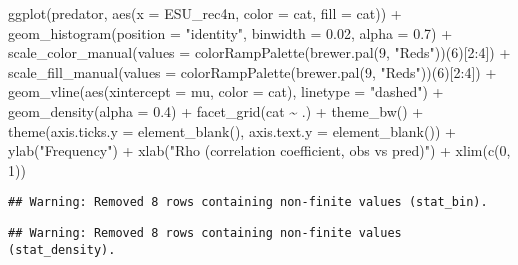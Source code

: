\documentclass[
]{article}
\newenvironment{Shaded}{\begin{snugshade}}{\end{snugshade}}
\newcommand{\AttributeTok}[1]{\textcolor[rgb]{0.77,0.63,0.00}{#1}}
\newcommand{\DecValTok}[1]{\textcolor[rgb]{0.00,0.00,0.81}{#1}}
\newcommand{\FloatTok}[1]{\textcolor[rgb]{0.00,0.00,0.81}{#1}}
\newcommand{\FunctionTok}[1]{\textcolor[rgb]{0.00,0.00,0.00}{#1}}
\newcommand{\NormalTok}[1]{#1}
\newcommand{\SpecialCharTok}[1]{\textcolor[rgb]{0.00,0.00,0.00}{#1}}
\newcommand{\StringTok}[1]{\textcolor[rgb]{0.31,0.60,0.02}{#1}}
\begin{document}
\begin{Shaded}
\begin{Highlighting}[]
\FunctionTok{ggplot}\NormalTok{(predator, }\FunctionTok{aes}\NormalTok{(}\AttributeTok{x =}\NormalTok{ ESU\_rec4n, }\AttributeTok{color =}\NormalTok{ cat, }\AttributeTok{fill =}\NormalTok{ cat)) }\SpecialCharTok{+} 
  \FunctionTok{geom\_histogram}\NormalTok{(}\AttributeTok{position =} \StringTok{"identity"}\NormalTok{, }\AttributeTok{binwidth =} \FloatTok{0.02}\NormalTok{, }\AttributeTok{alpha =} \FloatTok{0.7}\NormalTok{) }\SpecialCharTok{+}
  \FunctionTok{scale\_color\_manual}\NormalTok{(}\AttributeTok{values =} \FunctionTok{colorRampPalette}\NormalTok{(}\FunctionTok{brewer.pal}\NormalTok{(}\DecValTok{9}\NormalTok{, }\StringTok{"Reds"}\NormalTok{))(}\DecValTok{6}\NormalTok{)[}\DecValTok{2}\SpecialCharTok{:}\DecValTok{4}\NormalTok{]) }\SpecialCharTok{+}
  \FunctionTok{scale\_fill\_manual}\NormalTok{(}\AttributeTok{values =} \FunctionTok{colorRampPalette}\NormalTok{(}\FunctionTok{brewer.pal}\NormalTok{(}\DecValTok{9}\NormalTok{, }\StringTok{"Reds"}\NormalTok{))(}\DecValTok{6}\NormalTok{)[}\DecValTok{2}\SpecialCharTok{:}\DecValTok{4}\NormalTok{]) }\SpecialCharTok{+}
  \FunctionTok{geom\_vline}\NormalTok{(}\FunctionTok{aes}\NormalTok{(}\AttributeTok{xintercept =}\NormalTok{ mu, }\AttributeTok{color =}\NormalTok{ cat),}
             \AttributeTok{linetype =} \StringTok{"dashed"}\NormalTok{) }\SpecialCharTok{+}
  \FunctionTok{geom\_density}\NormalTok{(}\AttributeTok{alpha =} \FloatTok{0.4}\NormalTok{) }\SpecialCharTok{+} \FunctionTok{facet\_grid}\NormalTok{(cat }\SpecialCharTok{\textasciitilde{}}\NormalTok{ .) }\SpecialCharTok{+}
  \FunctionTok{theme\_bw}\NormalTok{() }\SpecialCharTok{+}
  \FunctionTok{theme}\NormalTok{(}\AttributeTok{axis.ticks.y =} \FunctionTok{element\_blank}\NormalTok{(),}
        \AttributeTok{axis.text.y =} \FunctionTok{element\_blank}\NormalTok{()) }\SpecialCharTok{+}
  \FunctionTok{ylab}\NormalTok{(}\StringTok{"Frequency"}\NormalTok{) }\SpecialCharTok{+} \FunctionTok{xlab}\NormalTok{(}\StringTok{"Rho (correlation coefficient, obs vs pred)"}\NormalTok{) }\SpecialCharTok{+}
  \FunctionTok{xlim}\NormalTok{(}\FunctionTok{c}\NormalTok{(}\DecValTok{0}\NormalTok{, }\DecValTok{1}\NormalTok{))}
\end{Highlighting}
\end{Shaded}

\begin{verbatim}
## Warning: Removed 8 rows containing non-finite values (stat_bin).
\end{verbatim}

\begin{verbatim}
## Warning: Removed 8 rows containing non-finite values (stat_density).
\end{verbatim}
\end{document}
